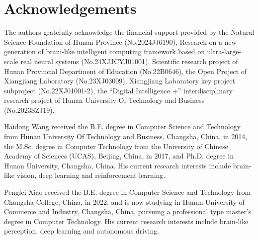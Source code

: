 \documentclass[journal,twoside,web]{ieeecolor}
\begin{document}
\section{Acknowledgements}
The authors gratefully acknowledge the financial support provided by the Natural Science Foundation of Hunan Province (No.2024JJ6190), Research on a new generation of brain-like intelligent computing framework based on ultra-large-scale real neural systems (No.24XJJCYJ01001), Scientific research project of Hunan Provincial Department of Education (No.22B0646), the Open Project of Xiangjiang Laboratory (No.23XJ03009), Xiangjiang Laboratory key project subproject (No.22XJ01001-2), the “Digital Intelligence +” interdisciplinary research project of Hunan University Of Technology and Business (No.2023SZJ19).





\begin{IEEEbiography}{Haidong Wang} received the B.E. degree in Computer Science and Technology from Hunan University Of Technology and Business, Changsha, China, in 2014, the M.Sc. degree in Computer Technology from the University of Chinese Academy of Sciences (UCAS), Beijing, 	China, in 2017, and Ph.D. degree in Hunan University, Changsha, China. His current research interests include brain-like vision, deep learning and reinforcement learning.
\end{IEEEbiography}

\begin{IEEEbiography}{Pengfei Xiao} received the B.E. degree in Computer Science and Technology from Changsha College, China, in 2022, and is now studying in Hunan University of Commerce and Industry, Changsha, China, pursuing a professional type master's degree in Computer Technology. His current research interests include brain-like perception, deep learning and autonomous driving.
\end{IEEEbiography}
\end{document}
